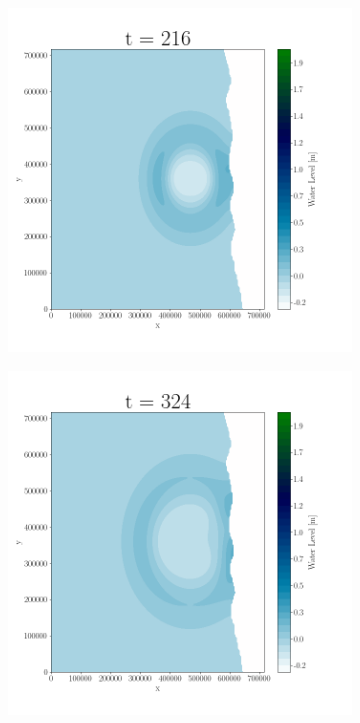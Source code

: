 \begin{figure}[H]
\begin{subfigure}[b]{.4\linewidth}
\includegraphics[width=\linewidth]{Figures/4-3.png}
\caption{}
\end{subfigure}
\begin{subfigure}[b]{.4\linewidth}
\includegraphics[width=\linewidth]{Figures/4-4.png}
\caption{}
\end{subfigure}


\end{figure}
